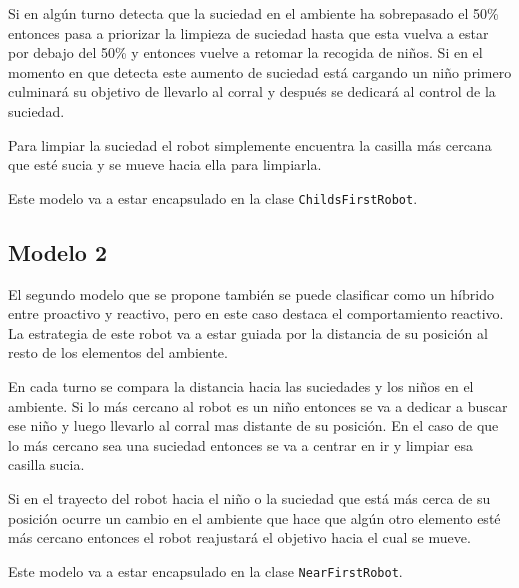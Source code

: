 \documentclass[12pt,a4paper]{article}
\begin{document}
	Si en alg\'un turno detecta que la suciedad en el ambiente ha sobrepasado el 50\% entonces pasa a priorizar la limpieza de suciedad hasta que esta vuelva a estar por debajo del 50\% y entonces vuelve a retomar la recogida de ni\~nos. Si en el momento en que detecta este aumento de suciedad est\'a cargando un ni\~no primero culminar\'a su objetivo de llevarlo al corral y despu\'es se dedicar\'a al control de la suciedad. 
	
	Para limpiar la suciedad el robot simplemente encuentra la
	casilla m\'as cercana que est\'e sucia y se mueve hacia ella para limpiarla.
	
	Este modelo va a estar encapsulado en la clase \texttt{ChildsFirstRobot}.
	
	
	\subsection{Modelo 2}
		El segundo modelo que se propone tambi\'en se puede clasificar como un h\'ibrido entre proactivo y reactivo, pero en este caso destaca el comportamiento reactivo. La estrategia de este robot va a estar guiada por la distancia de su posici\'on al resto de los elementos del ambiente.
		
		En cada turno se compara la distancia hacia las suciedades y los ni\~nos en el ambiente. Si lo m\'as cercano al robot es un ni\~no entonces se va a dedicar a buscar ese ni\~no y luego llevarlo al corral mas distante de su posici\'on. En el caso de que lo m\'as cercano sea una suciedad entonces se va a centrar en ir y limpiar esa casilla sucia.
		
		Si en el trayecto del robot hacia el ni\~no o la suciedad que est\'a m\'as cerca de su posici\'on ocurre un cambio en el ambiente que hace que alg\'un otro elemento est\'e m\'as cercano entonces el robot reajustar\'a el objetivo hacia el cual se mueve. 
		
		Este modelo va a estar encapsulado en la clase \texttt{NearFirstRobot}.    
	
\end{document}
